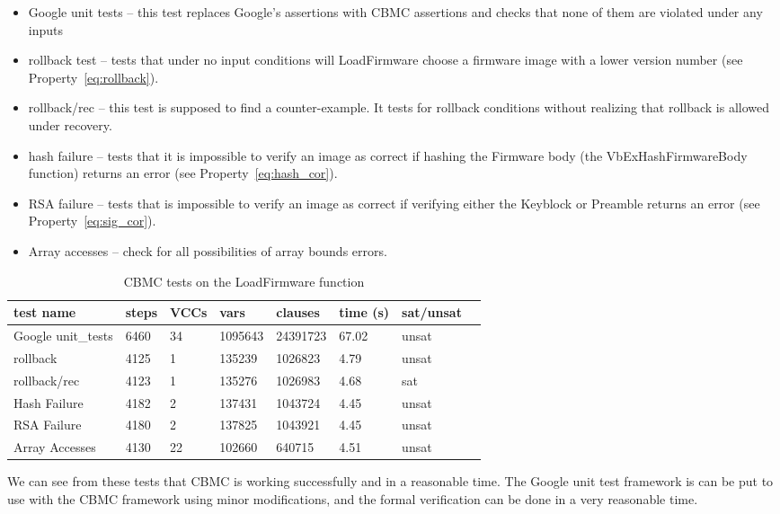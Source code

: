 \documentclass[../report.tex]{subfiles}
\begin{document}
\begin{itemize}
 \item  Google unit tests -- this test replaces Google's assertions with CBMC assertions and checks that none of them are violated under any inputs
 \item  rollback test -- tests that under no input conditions will LoadFirmware choose a firmware image with a lower version number (see Property~\ref{eq:rollback}).
 \item  rollback/rec  -- this test is supposed to find a counter-example. It tests for rollback conditions without realizing that rollback is allowed under recovery. 
 \item  hash failure -- tests that it is impossible to verify an image as correct  if hashing the Firmware body (the VbExHashFirmwareBody function) returns an error (see Property~\ref{eq:hash_cor}).
 \item  RSA failure -- tests that is impossible to verify an image as correct if verifying either the Keyblock or Preamble returns an error (see Property~\ref{eq:sig_cor}).
 \item  Array accesses -- check for all possibilities of array bounds errors.
\end{itemize}

\begin{table}[!htbp]
    \centering
    \caption{CBMC tests on the LoadFirmware function}\label{ldfw_results}
    \begin{tabular}{|l|l|l|l|l|l|l|l|}
        \hline
        test name & steps & VCCs & vars  & clauses & time (s) & sat/unsat  \\ \hline \hline
        Google unit\_tests & 6460 & 34 & 1095643 & 24391723 & 67.02 & unsat \\ \hline
        rollback     & 4125 & 1 & 135239 & 1026823 & 4.79 & unsat \\ \hline
        rollback/rec & 4123 & 1 & 135276 & 1026983 & 4.68 & sat \\ \hline
        Hash Failure & 4182 & 2 & 137431 & 1043724 & 4.45 & unsat \\ \hline
        RSA  Failure & 4180 & 2 & 137825 & 1043921 & 4.45 & unsat \\ \hline
        Array Accesses & 4130 & 22 & 102660 & 640715 & 4.51 & unsat \\ \hline
    \end{tabular}
\end{table}

We can see from these tests that CBMC is working successfully and in a reasonable time.
The Google unit test framework is can be put to use with the CBMC framework using minor modifications, and the formal verification can be done in a very reasonable time.
\end{document}
